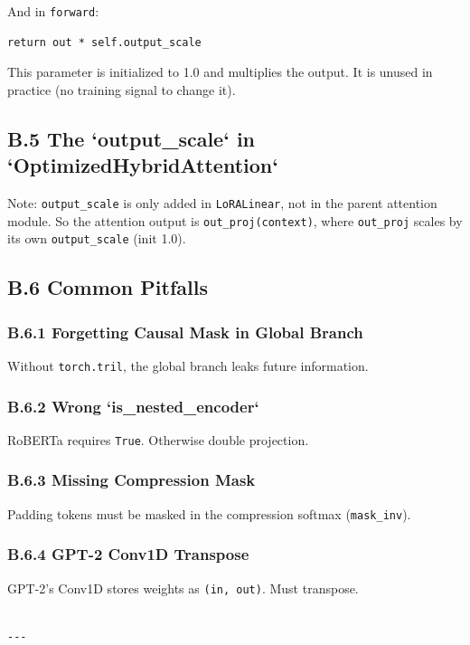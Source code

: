 And in \texttt{forward}:

\begin{lstlisting}
return out * self.output_scale
\end{lstlisting}

This parameter is initialized to 1.0 and multiplies the output. It is 
unused in practice (no training signal to change it).

\subsection{B.5 The `output\_scale` in `OptimizedHybridAttention`}

Note: \texttt{output\_scale} is only added in \texttt{LoRALinear}, not in the parent 
attention module. So the attention output is \texttt{out\_proj(context)}, where 
\texttt{out\_proj} scales by its own \texttt{output\_scale} (init 1.0).

\subsection{B.6 Common Pitfalls}

\subsubsection{B.6.1 Forgetting Causal Mask in Global Branch}

Without \texttt{torch.tril}, the global branch leaks future information.

\subsubsection{B.6.2 Wrong `is\_nested\_encoder`}

RoBERTa requires \texttt{True}. Otherwise double projection.

\subsubsection{B.6.3 Missing Compression Mask}

Padding tokens must be masked in the compression softmax (\texttt{mask\_inv}).

\subsubsection{B.6.4 GPT-2 Conv1D Transpose}

GPT-2's Conv1D stores weights as \texttt{(in, out)}. Must transpose.
\begin{lstlisting}

---
\end{lstlisting}